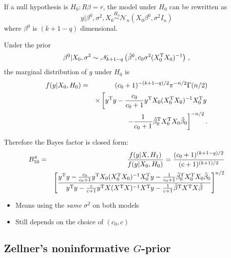 \begin{slide}
\end{slide}\begin{slide}

If a null hypothesis is $H_0:R\beta=r$, the model under $H_0$ can be rewritten as
$$
y|\beta^0,\sigma^2,X_0\stackrel{H_0}{\sim}\mathscr{N}_n\left(X_0\beta^0,\sigma^2I_n\right)
$$
where $\beta^0$ is $(k+1-q)$ dimensional.

\end{slide}\begin{slide}

Under the prior 
$$
\beta^0|X_0,\sigma^2\sim\mathscr{N}_{k+1-q}\left(\tilde\beta^0,c_0\sigma^2(X_0^{\mathrm{T}} X_0)^{-1}\right)\,,
$$
the marginal distribution of $y$ under $H_0$ is
\small
\begin{eqnarray*}
f(y|X_0,H_0) & = & (c_0+1)^{-(k+1-q)/2}\pi^{-n/2}\Gamma(n/2) \\
             &   & \times\left[y^{\mathrm{T}} y-\frac{c_0}{c_0+1}y^{\mathrm{T}} X_0(X_0^{\mathrm{T}} X_0)^{-1}X_0^{\mathrm{T}} y\right. \\
             &   & \left.-\frac{1}{c_0+1}\tilde\beta_0^{\mathrm{T}} X_0^{\mathrm{T}} X_0\tilde\beta_0\right]^{-n/2}.
\end{eqnarray*}
\normalsize

\end{slide}\begin{slide}

Therefore the Bayes factor is closed form:
\small
\begin{eqnarray*}
B^\pi_{10} & = & \frac{f(y|X,H_1)}{f(y|X_0,H_0)} 
             =   \frac{(c_0+1)^{(k+1-q)/2}}{(c+1)^{(k+1)/2}} \\
           &   & \left[\frac{y^{\mathrm{T}} y-\frac{c_0}{c_0+1}y^{\mathrm{T}} X_0(X_0^{\mathrm{T}} X_0)^{-1}X_0^{\mathrm{T}} y
                 -\frac{1}{c_0+1}\tilde\beta_0^{\mathrm{T}} X_0^{\mathrm{T}} X_0\tilde\beta_0}{y^{\mathrm{T}} y
	         -\frac{c}{c+1}y^{\mathrm{T}} X(X^{\mathrm{T}} X)^{-1}X^{\mathrm{T}} y-
                 \frac{1}{c+1}\tilde\beta^{\mathrm{T}} X^{\mathrm{T}} X\tilde\beta}\right]^{n/2}
\end{eqnarray*}
\normalsize

\pause
\begin{itemize}
\item Means using the {\em same} $\sigma^2$ on both models
\item Still depends on the choice of $(c_0,c)$
\end{itemize}

\end{slide}\subsection{Zellner's noninformative $G$-prior}

